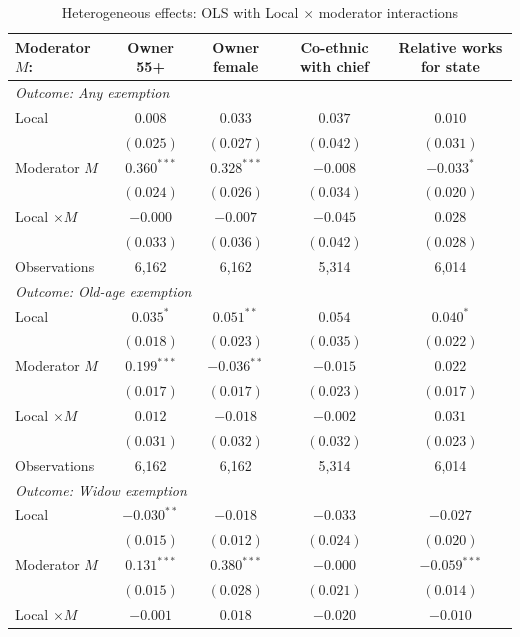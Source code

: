 \begin{table}[!htbp]\centering\footnotesize
\caption{Heterogeneous effects: OLS with Local $\times$ moderator interactions}\label{tab:het}
\begin{threeparttable}
\begin{tabular}{lcccc}
\toprule
Moderator $M$: & Owner 55+ & Owner female & Co-ethnic with chief & Relative works for state \\
\midrule
\multicolumn{5}{l}{\textit{Outcome: Any exemption}} \\
Local & $0.008$ & $0.033$ & $0.037$ & $0.010$ \\
 & $(0.025)$ & $(0.027)$ & $(0.042)$ & $(0.031)$ \\
Moderator $M$ & $0.360^{***}$ & $0.328^{***}$ & $-0.008$ & $-0.033^{*}$ \\
 & $(0.024)$ & $(0.026)$ & $(0.034)$ & $(0.020)$ \\
Local $\times M$ & $-0.000$ & $-0.007$ & $-0.045$ & $0.028$ \\
 & $(0.033)$ & $(0.036)$ & $(0.042)$ & $(0.028)$ \\
Observations & 6,162 & 6,162 & 5,314 & 6,014 \\
\midrule
\multicolumn{5}{l}{\textit{Outcome: Old-age exemption}} \\
Local & $0.035^{*}$ & $0.051^{**}$ & $0.054$ & $0.040^{*}$ \\
 & $(0.018)$ & $(0.023)$ & $(0.035)$ & $(0.022)$ \\
Moderator $M$ & $0.199^{***}$ & $-0.036^{**}$ & $-0.015$ & $0.022$ \\
 & $(0.017)$ & $(0.017)$ & $(0.023)$ & $(0.017)$ \\
Local $\times M$ & $0.012$ & $-0.018$ & $-0.002$ & $0.031$ \\
 & $(0.031)$ & $(0.032)$ & $(0.032)$ & $(0.023)$ \\
Observations & 6,162 & 6,162 & 5,314 & 6,014 \\
\midrule
\multicolumn{5}{l}{\textit{Outcome: Widow exemption}} \\
Local & $-0.030^{**}$ & $-0.018$ & $-0.033$ & $-0.027$ \\
 & $(0.015)$ & $(0.012)$ & $(0.024)$ & $(0.020)$ \\
Moderator $M$ & $0.131^{***}$ & $0.380^{***}$ & $-0.000$ & $-0.059^{***}$ \\
 & $(0.015)$ & $(0.028)$ & $(0.021)$ & $(0.014)$ \\
Local $\times M$ & $-0.001$ & $0.018$ & $-0.020$ & $-0.010$ \\

\end{tabular}
\end{threeparttable}
\end{table}

